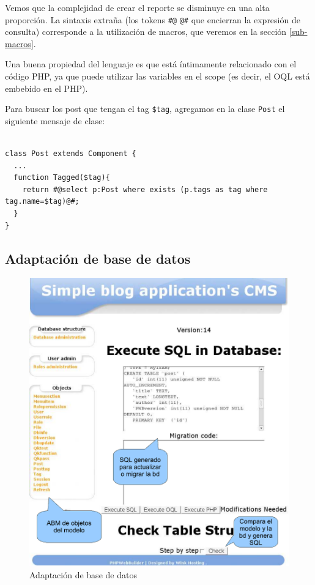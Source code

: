 Vemos que la complejidad de crear el reporte se disminuye en una alta proporción.
La sintaxis extraña (los tokens \verb"#@" \verb"@#" que encierran la expresión de consulta) corresponde a la utilización de macros, que veremos en la sección \ref{sub-macros}.

Una buena propiedad del lenguaje es que está íntimamente relacionado con el código PHP, ya que puede utilizar las variables en el scope (es decir, el OQL está embebido en el PHP).

Para buscar los post que tengan el tag  \verb"$tag", %
agregamos en la clase \verb"Post" el siguiente mensaje de clase:

\begin{verbatim}

class Post extends Component {
  ...
  function Tagged($tag){
    return #@select p:Post where exists (p.tags as tag where tag.name=$tag)@#;
  }
}

\end{verbatim}

\subsection{Adaptación de base de datos}
\label{sub-adapt}
\begin{figure}
	\centering
	\includegraphics[scale=0.5]{images/admin2.pdf}
 	\caption{Adaptación de base de datos}
 	\label{fig-admin1}
\end{figure}

